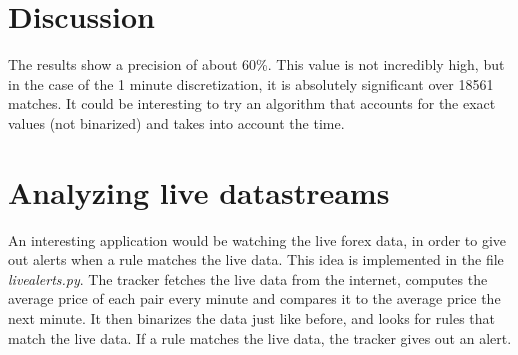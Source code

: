 \documentclass[paper=a4,fontsize=11pt,DIV=8,BCOR=5mm,twoside,pdftex]{scrartcl}
\begin{document}
	\section{Discussion}
	
	The results show a precision of about 60\%. This value is not incredibly high, but in the case of the 1 minute discretization, it is absolutely significant over 18561 matches. It could be interesting to try an algorithm that accounts for the exact values (not binarized) and takes into account the time.
	
	\section{Analyzing live datastreams}
	
	An interesting application would be watching the live forex data, in order to give out alerts when a rule matches the live data. This idea is implemented in the file \textit{livealerts.py}. The tracker fetches the live data from the internet, computes the average price of each pair every minute and compares it to the average price the next minute. It then binarizes the data just like before, and looks for rules that match the live data. If a rule matches the live data, the tracker gives out an alert.
	
\end{document}
